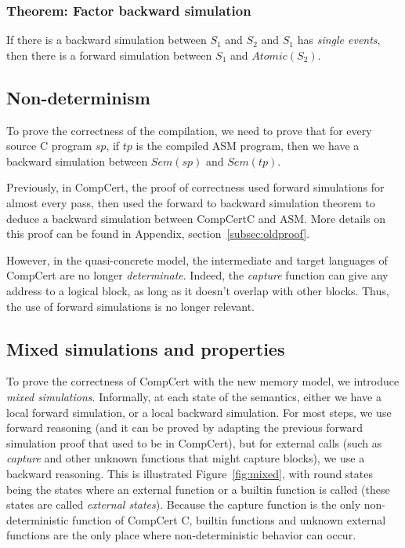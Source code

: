 \subsubsection{Theorem: Factor backward simulation} If there is a backward simulation between $S_1$ and $S_2$ and $S_1$ has \textit{single events}, then there is a forward simulation between $S_1$ and $\mathit{Atomic}(S_2)$.

\subsection{Non-determinism}
To prove the correctness of the compilation, we need to prove that for every source C program $sp$, if $tp$ is the compiled ASM program, then we have a backward simulation between $\mathit{Sem}(sp)$ and $\mathit{Sem}(tp)$.

Previously, in CompCert, the proof of correctness used forward simulations for almost every pass, then used the forward to backward simulation theorem to deduce a backward simulation between CompCertC and ASM. More details on this proof can be found in Appendix, section~\ref{subsec:oldproof}.

However, in the quasi-concrete model, the intermediate and target languages of CompCert are no longer \textit{determinate}. Indeed, the \textit{capture} function can give any address to a logical block, as long as it doesn't overlap with other blocks.
Thus, the use of forward simulations is no longer relevant.

\subsection{Mixed simulations and properties}
To prove the correctness of CompCert with the new memory model, we introduce \textit{mixed simulations}. Informally, at each state of the semantics, either we have a local forward simulation, or a local backward simulation. For most steps, we use forward reasoning (and it can be proved by adapting the previous forward simulation proof that used to be in CompCert), but for external calls (such as \textit{capture} and other unknown functions that might capture blocks), we use a backward reasoning. This is illustrated Figure~\ref{fig:mixed}, with round states being the states where an external function or a builtin function is called (these states are called \textit{external states}). Because the capture function is the only non-deterministic function of CompCert C, builtin functions and unknown external functions are the only place where non-deterministic behavior can occur.

